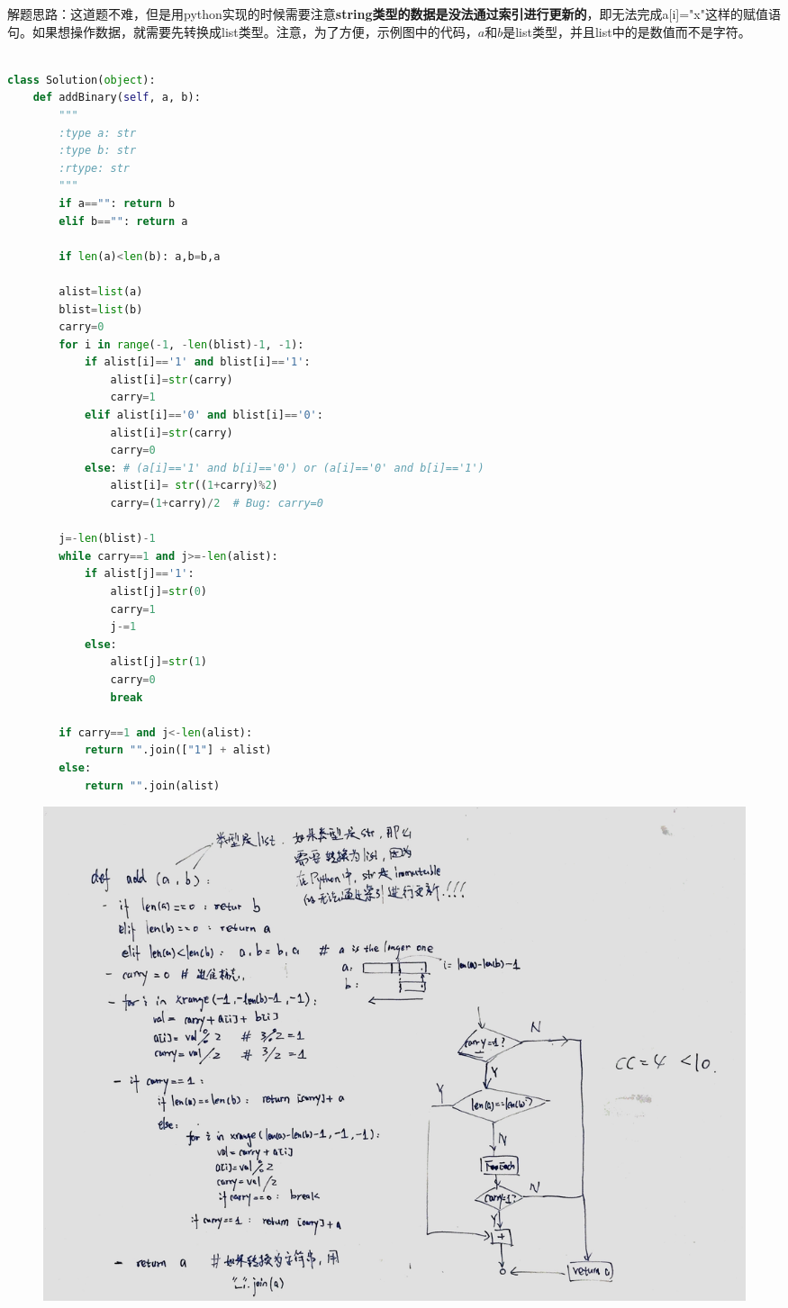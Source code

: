 \documentclass[a4paper,10pt]{article}
\begin{document}
\begin{CJK*}{UTF8}{gbsn}
\noindent 解题思路：这道题不难，但是用python实现的时候需要注意\textbf{string类型的数据是没法通过索引进行更新的}，即无法完成a[i]="x"这样的赋值语句。如果想操作数据，就需要先转换成list类型。注意，为了方便，示例图中的代码，$a$和$b$是list类型，并且list中的是数值而不是字符。\\
\end{CJK*}

\begin{lstlisting}[language=Python, caption=Problem67. Add Binary]

class Solution(object):
    def addBinary(self, a, b):
        """
        :type a: str
        :type b: str
        :rtype: str
        """
        if a=="": return b
        elif b=="": return a
        
        if len(a)<len(b): a,b=b,a
        
        alist=list(a)
        blist=list(b)
        carry=0
        for i in range(-1, -len(blist)-1, -1):
            if alist[i]=='1' and blist[i]=='1':
                alist[i]=str(carry)
                carry=1
            elif alist[i]=='0' and blist[i]=='0':
                alist[i]=str(carry)
                carry=0
            else: # (a[i]=='1' and b[i]=='0') or (a[i]=='0' and b[i]=='1')
                alist[i]= str((1+carry)%2)
                carry=(1+carry)/2  # Bug: carry=0
        
        j=-len(blist)-1
        while carry==1 and j>=-len(alist):
            if alist[j]=='1':
                alist[j]=str(0)
                carry=1
                j-=1
            else:
                alist[j]=str(1)
                carry=0
                break

        if carry==1 and j<-len(alist):
            return "".join(["1"] + alist)
        else:
            return "".join(alist)
\end{lstlisting}

\begin{figure}[h]
    \includegraphics[width=\textwidth]{leetcode67.jpg}
    \centering \\
\end{figure}
\end{document}
